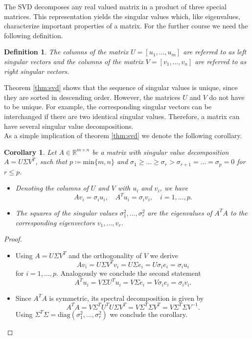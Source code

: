 \documentclass[11pt, a4paper]{article}
\newtheorem{corollary}[theorem]{Corollary}
\newtheorem{definition}[theorem]{Definition}
\newcommand{\R}{\mathds{R}}
\begin{document}
The SVD decomposes any real valued matrix in a product of three special matrices. This representation yields the singular values which, like eigenvalues, characterize important properties of a matrix. For the further course we need the following definition.

\begin{definition}
The columns of the matrix $U = [u_1, \dots, u_m]$ are referred to as left singular vectors and the columns of the matrix $V = [v_1, \dots, v_n]$ are referred to as right singular vectors.
\end{definition}

Theorem \ref{thm:svd} shows that the sequence of singular values is unique, since they are sorted in descending order. However, the matrices $U$ and $V$ do not have to be unique. For example, the corresponding singular vectors can be interchanged if there are two identical singular values. Therefore, a matrix can have several singular value decompositions. \\

As a simple implication of theorem \ref{thm:svd} we denote the following corollary.

\begin{corollary}
Let $A \in \R^{m \times n}$ be a matrix with singular value decomposition $A=U \Sigma V^T$, such that $p \coloneq \text{min}\{m,n\}$ and $\sigma_1 \geq \dots \geq \sigma_r > \sigma_{r+1} = \dots = \sigma_p = 0$ for $r \leq p$.
\begin{itemize}
\item[1.] Denoting the columns of $U$ and $V$ with $u_i$ and $v_i$, we have
\[ A v_i = \sigma_i u_i, \quad A^T u_i = \sigma_i v_i, \quad i=1,\dots,p.\]
\item[2.] The squares of the singular values $\sigma_1^2, \dots, \sigma_r^2$ are the eigenvalues of $A^TA$ to the corresponding eigenvectors $v_1, \dots, v_r$.
\end{itemize}
\end{corollary}

\begin{proof}
\ 
\begin{itemize}
\item[1.] Using $A=U \Sigma V^T$ and the orthogonality of $V$ we derive
\[ Av_i = U \Sigma V^T v_i = U \Sigma e_i = U \sigma_i e_i = \sigma_i u_i \]
for $i=1, \dots, p$. Analogously we conclude the second statement
\[ A^T u_i = V \Sigma U^T u_i = V \Sigma e_i = V \sigma_i e_i = \sigma_i v_i. \]
\item[2.] Since $A^TA$ is symmetric, its spectral decomposition is given by
\[ A^TA = V \Sigma^T U^T U \Sigma V^T = V \Sigma^T \Sigma V^T = V \Sigma^T \Sigma V^{-1}. \]
Using $\Sigma^T \Sigma = \text{diag}(\sigma_1^2, \dots, \sigma_r^2)$ we conclude the corollary. \qedhere
\end{itemize}
\end{proof}
\end{document}
